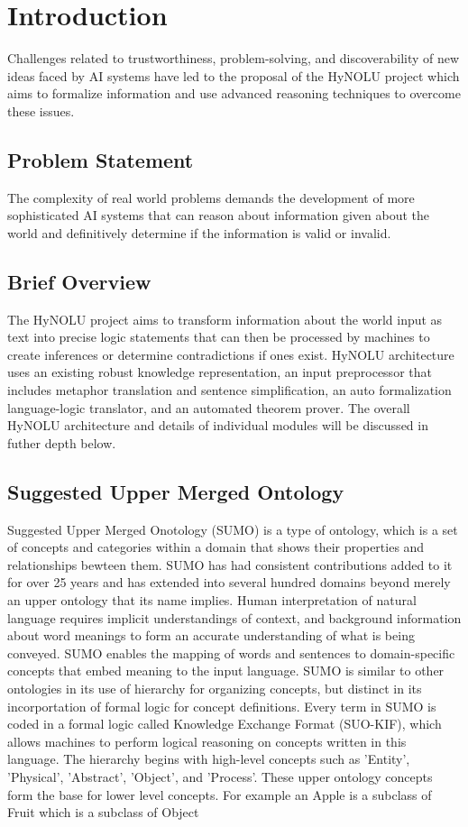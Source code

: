 

\chapter{Introduction}\label{ch:common}

Challenges related to trustworthiness, problem-solving, and discoverability of new ideas faced by AI systems have led to the proposal of the HyNOLU project which aims to formalize information and use advanced reasoning techniques to overcome these issues.

\section{Problem Statement}
The complexity of real world problems demands the development of more sophisticated AI systems
that can reason about information given about the world and definitively determine if the information is valid or invalid.

\section{Brief Overview}
The HyNOLU project aims to transform information about the world input as text into precise logic statements that can then be processed by machines to create inferences or determine contradictions if ones exist. HyNOLU architecture uses an existing robust knowledge representation, an input preprocessor that includes metaphor translation and sentence simplification, an auto formalization language-logic translator, and an automated theorem prover. The overall HyNOLU architecture and details of individual modules will be discussed in futher depth below.

\section{Suggested Upper Merged Ontology}
Suggested Upper Merged Onotology (SUMO) is a type of ontology, which is a set of concepts and categories within a domain that shows their properties and relationships bewteen them. SUMO has had consistent contributions added to it for over 25 years and has extended into several hundred domains beyond merely an upper ontology that its name implies. Human interpretation of natural language requires implicit understandings of context, and background information about word meanings to form an accurate understanding of what is being conveyed. SUMO enables the mapping of words and sentences to domain-specific concepts that embed meaning to the input language. SUMO is similar to other ontologies in its use of hierarchy for organizing concepts, but distinct in its incorportation of formal logic for concept definitions. Every term in SUMO is coded in a formal logic called Knowledge Exchange Format (SUO-KIF), which allows machines to perform logical reasoning on concepts written in this language. The hierarchy begins with high-level concepts such as 'Entity', 'Physical', 'Abstract', 'Object', and 'Process'. These upper ontology concepts form the base for lower level concepts. For example an Apple is a subclass of Fruit which is a subclass of Object






